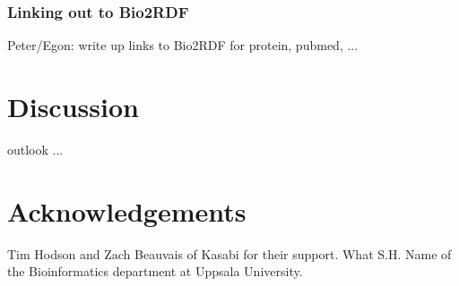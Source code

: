 \documentclass[sw]{iosart2c}
\begin{document}
\subsubsection{Linking out to Bio2RDF}

Peter/Egon: write up links to Bio2RDF for protein, pubmed, ...

\section{Discussion}

outlook ...

\section{Acknowledgements}

Tim Hodson and Zach Beauvais of Kasabi for their support. What S.H. Name of the Bioinformatics department at Uppsala University.



%
%
%
\end{document}
